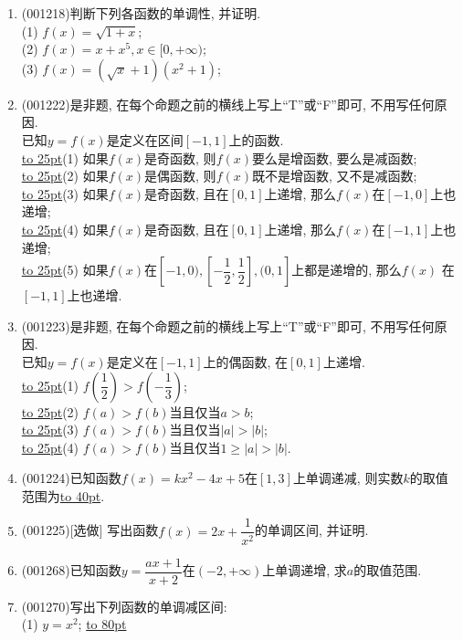\documentclass[10pt,a4paper]{article}
\newcommand{\blank}[1]{\underline{\hbox to #1pt{}}}
\begin{document}
\begin{enumerate}[1.]
\blank{25}(7) 如果定义在$\mathbf{R}$上的函数$y=g(x)$满足$y=g(f(x))$在$\mathbf{R}$上递增, 则$y=g(x)$在$\mathbf{R}$上递增;\\ 
\blank{25}(8) 如果定义在$\mathbf{R}$上的函数$y=g(x)$满足$y=g(f(x))$在$\mathbf{R}$上递减, 则$y=g(x)$在$\mathbf{R}$上递减.
\item {\tiny (001218)}判断下列各函数的单调性, 并证明.\\ 
(1) $f(x)=\sqrt{1+x}$;\\ 
(2) $f(x)=x+x^5,x\in[0,+\infty)$;\\ 
(3) $f(x)=(\sqrt{x}+1)(x^2+1)$;
\item {\tiny (001222)}是非题, 在每个命题之前的横线上写上``T''或``F''即可, 不用写任何原因.\\ 
已知$y=f(x)$是定义在区间$[-1,1]$上的函数.\\ 
\blank{25}(1) 如果$f(x)$是奇函数, 则$f(x)$要么是增函数, 要么是减函数;\\ 
\blank{25}(2) 如果$f(x)$是偶函数, 则$f(x)$既不是增函数, 又不是减函数;\\ 
\blank{25}(3) 如果$f(x)$是奇函数, 且在$[0,1]$上递增, 那么$f(x)$在$[-1,0]$上也递增;\\ 
\blank{25}(4) 如果$f(x)$是奇函数, 且在$[0,1]$上递增, 那么$f(x)$在$[-1,1]$上也递增;\\ 
\blank{25}(5) 如果$f(x)$在$[-1,0),[-\dfrac{1}{2},\dfrac{1}{2}],(0,1]$上都是递增的, 那么$f(x)$ 在$[-1,1]$上也递增.
\item {\tiny (001223)}是非题, 在每个命题之前的横线上写上``T''或``F''即可, 不用写任何原因.\\ 
已知$y=f(x)$是定义在$[-1,1]$上的偶函数, 在$[0,1]$上递增.\\ 
\blank{25}(1) $f(\dfrac{1}{2})>f(-\dfrac{1}{3})$;\\ 
\blank{25}(2) $f(a)>f(b)$当且仅当$a>b$;\\ 
\blank{25}(3) $f(a)>f(b)$当且仅当$|a|>|b|$;\\ 
\blank{25}(4) $f(a)>f(b)$当且仅当$1\ge |a|>|b|$.
\item {\tiny (001224)}已知函数$f(x)=kx^2-4x+5$在$[1,3]$上单调递减, 则实数$k$的取值范围为\blank{40}.
\item {\tiny (001225)}[选做]
写出函数$f(x)=2x+\dfrac{1}{x^2}$的单调区间, 并证明.
\item {\tiny (001268)}已知函数$y=\dfrac{ax+1}{x+2}$在$(-2,+\infty)$上单调递增, 求$a$的取值范围.
\item {\tiny (001270)}写出下列函数的单调减区间:\\ 
(1) $y=x^2$; \blank{80}\\ 

\end{enumerate}
\end{document}

